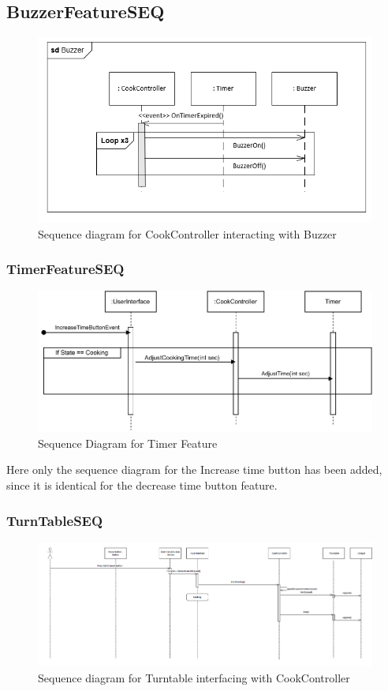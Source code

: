 \subsection{BuzzerFeatureSEQ}
\begin{figure}[h]
  \centering
  \includegraphics[scale=0.6]{02-Body/Image/BuzzerSEQ.PNG}
  \caption{Sequence diagram for CookController interacting with Buzzer}%
  \label{fig:BuzzerSeq}
\end{figure}

\subsubsection{TimerFeatureSEQ}
\begin{figure}[h]
  \centering
  \includegraphics[scale=0.8]{02-Body/Image/TimerFeatureSEQ.pdf}
  \caption{Sequence Diagram for Timer Feature}%
  \label{fig:timeFeature}
\end{figure}

Here only the sequence diagram for the Increase time button has been added, since it
is identical for the decrease time button feature.

\newpage

\subsubsection{TurnTableSEQ}
\begin{figure}[h]
  \centering
  \includegraphics[scale=0.6]{02-Body/Image/TurntableSeq.PNG}
  \caption{Sequence diagram for Turntable interfacing with CookController}%
  \label{fig:TurntableSeq}
\end{figure}

\newpage
